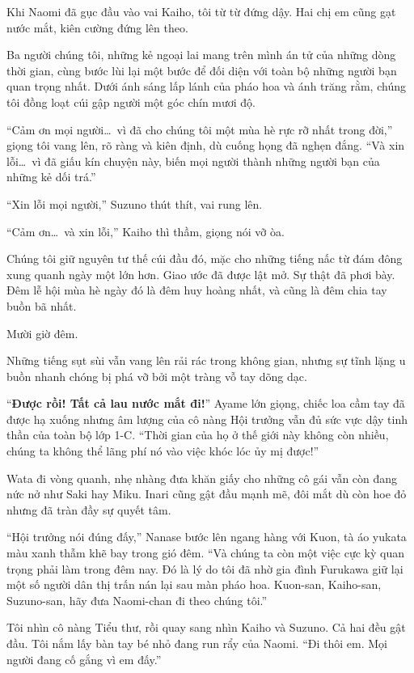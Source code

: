 \documentclass[../main.tex]{subfiles}
\begin{document}
Khi Naomi đã gục đầu vào vai Kaiho, tôi từ từ đứng dậy. Hai chị em cũng gạt nước mắt, kiên cường đứng lên theo.

Ba người chúng tôi, những kẻ ngoại lai mang trên mình án tử của những dòng thời gian, cùng bước lùi lại một bước để đối diện với toàn bộ những người bạn quan trọng nhất. Dưới ánh sáng lấp lánh của pháo hoa và ánh trăng rằm, chúng tôi đồng loạt cúi gập người một góc chín mươi độ.

``Cảm ơn mọi người\dots\ vì đã cho chúng tôi một mùa hè rực rỡ nhất trong đời,'' giọng tôi vang lên, rõ ràng và kiên định, dù cuống họng đã nghẹn đắng. ``Và xin lỗi\dots\ vì đã giấu kín chuyện này, biến mọi người thành những người bạn của những kẻ dối trá.''

``Xin lỗi mọi người,'' Suzuno thút thít, vai rung lên.

``Cảm ơn\dots\ và xin lỗi,'' Kaiho thì thầm, giọng nói vỡ òa.

Chúng tôi giữ nguyên tư thế cúi đầu đó, mặc cho những tiếng nấc từ đám đông xung quanh ngày một lớn hơn. Giao ước đã được lật mở. Sự thật đã phơi bày. Đêm lễ hội mùa hè ngày đó là đêm huy hoàng nhất, và cũng là đêm chia tay buồn bã nhất.

\ct

Mười giờ đêm.

Những tiếng sụt sùi vẫn vang lên rải rác trong không gian, nhưng sự tĩnh lặng u buồn nhanh chóng bị phá vỡ bởi một tràng vỗ tay dõng dạc.

``\textbf{Được rồi! Tất cả lau nước mắt đi!}'' Ayame lớn giọng, chiếc loa cầm tay đã được hạ xuống nhưng âm lượng của cô nàng Hội trưởng vẫn đủ sức vực dậy tinh thần của toàn bộ lớp 1-C. ``Thời gian của họ ở thế giới này không còn nhiều, chúng ta không thể lãng phí nó vào việc khóc lóc ủy mị được!''

Wata đi vòng quanh, nhẹ nhàng đưa khăn giấy cho những cô gái vẫn còn đang nức nở như Saki hay Miku. Inari cũng gật đầu mạnh mẽ, đôi mắt dù còn hoe đỏ nhưng đã tràn đầy sự quyết tâm.

``Hội trưởng nói đúng đấy,'' Nanase bước lên ngang hàng với Kuon, tà áo yukata màu xanh thẫm khẽ bay trong gió đêm. ``Và chúng ta còn một việc cực kỳ quan trọng phải làm trong đêm nay. Đó là lý do tôi đã nhờ gia đình Furukawa giữ lại một số người dân thị trấn nán lại sau màn pháo hoa. Kuon-san, Kaiho-san, Suzuno-san, hãy đưa Naomi-chan đi theo chúng tôi.''

Tôi nhìn cô nàng Tiểu thư, rồi quay sang nhìn Kaiho và Suzuno. Cả hai đều gật đầu. Tôi nắm lấy bàn tay bé nhỏ đang run rẩy của Naomi. ``Đi thôi em. Mọi người đang cố gắng vì em đấy.''
\end{document}
